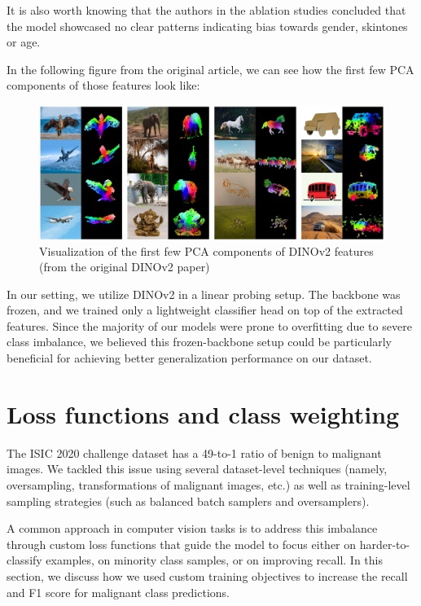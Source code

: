 It is also worth knowing that the authors in the ablation studies concluded that the model showcased no clear patterns indicating bias towards gender, skintones or age.

In the following figure from the original article, we can see how the first few PCA components of those features look like:

\begin{figure}[htbp]
\centering
\includegraphics[width=0.9\linewidth]{figures/dino_pca_comp_of_features.png}
\caption{Visualization of the first few PCA components of DINOv2 features (from the original DINOv2 paper)}
\label{fig:dino-pca}
\end{figure}


In our setting, we utilize DINOv2 in a linear probing setup. The backbone was frozen, and we trained only a lightweight classifier head on top of the extracted features. Since the majority of our models were prone to overfitting due to severe class imbalance, we believed this frozen-backbone setup could be particularly beneficial for achieving better generalization performance on our dataset.

\section{Loss functions and class weighting}

The ISIC 2020 challenge dataset has a 49-to-1 ratio of benign to malignant images. We tackled this issue using several dataset-level techniques (namely, oversampling, transformations of malignant images, etc.) as well as training-level sampling strategies (such as balanced batch samplers and oversamplers).

A common approach in computer vision tasks is to address this imbalance through custom loss functions that guide the model to focus either on harder-to-classify examples, on minority class samples, or on improving recall. In this section, we discuss how we used custom training objectives to increase the recall and F1 score for malignant class predictions.

